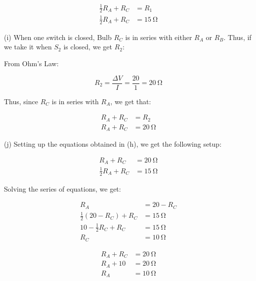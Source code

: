 \documentclass[12pt]{article}
\begin{document}
\begin{equation*}
    \begin{split}
        \frac{1}{2}R_A + R_C & = R_1 \\
        \frac{1}{2}R_A + R_C & = \SI{15}{\ohm}
    \end{split}
\end{equation*}

\bigskip

(i) When one switch is closed, Bulb $R_C$ is in series with either $R_A$ or $R_B$. Thus, if we take it when $S_2$ is closed, we get $R_2$:

\bigskip

From Ohm's Law:

\[R_2 = \frac{\Delta V}{I} = \frac{20}{1} = \SI{20}{\ohm}\]

Thus, since $R_C$ is in series with $R_A$, we get that:

\begin{equation*}
    \begin{split}
        R_A + R_C & = R_2 \\
        R_A + R_C & = \SI{20}{\ohm}
    \end{split}
\end{equation*}

\bigskip

(j) Setting up the equations obtained in (h), we get the following setup:

\begin{equation*}
    \begin{split}
        R_A + R_C & = \SI{20}{\ohm} \\
        \frac{1}{2}R_A + R_C & = \SI{15}{\ohm}
    \end{split}
\end{equation*}

\bigskip

Solving the series of equations, we get:

\begin{equation*}
    \begin{split}
        R_A & = 20 - R_C \\
        \frac{1}{2}(20 - R_C) + R_C & = \SI{15}{\ohm} \\
        10 - \frac{1}{2}R_C + R_C & = \SI{15}{\ohm} \\
        R_C & = \SI{10}{\ohm}
    \end{split}
\end{equation*}

\begin{equation*}
    \begin{split}
        R_A + R_C & = \SI{20}{\ohm} \\
        R_A + 10 & = \SI{20}{\ohm} \\
        R_A & = \SI{10}{\ohm}
    \end{split}
\end{equation*}
\end{document}
